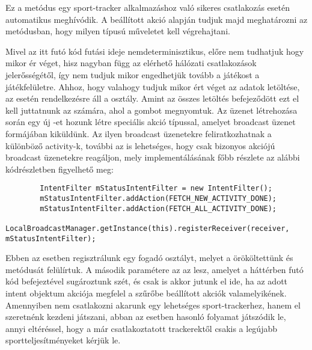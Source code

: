 Ez a metódus egy sport-tracker alkalmazáshoz való sikeres csatlakozás esetén automatikus meghívódik. 
A beállított akció alapján tudjuk majd meghatározni az  metódusban, hogy milyen típusú műveletet kell végrehajtani. 

Mivel az itt futó kód futási ideje nemdeterminisztikus, előre nem tudhatjuk hogy mikor ér véget, hisz nagyban függ az elérhető hálózati csatlakozások jelerősségétől, így nem tudjuk mikor engedhetjük tovább a játékost a játékfelületre. 
Ahhoz, hogy valahogy tudjuk mikor ért véget az adatok letöltése, az  esetén rendelkezésre áll a  osztály. 
Amint az összes letöltés befejeződött ezt el kell juttatnunk az  számára, ahol a gombot megnyomtuk. 
Az üzenet létrehozása során egy új -et hozunk létre speciális akció típussal, amelyet broadcast üzenet formájában kiküldünk. 
Az ilyen broadcast üzenetekre feliratkozhatnak a különböző activity-k, további az is lehetséges, hogy csak bizonyos akciójú broadcast üzenetekre reagáljon, mely implementálásának főbb részlete az alábbi kódrészletben figyelhető meg:

\begin{lstlisting}
        IntentFilter mStatusIntentFilter = new IntentFilter();
        mStatusIntentFilter.addAction(FETCH_NEW_ACTIVITY_DONE);
        mStatusIntentFilter.addAction(FETCH_ALL_ACTIVITY_DONE);
        LocalBroadcastManager.getInstance(this).registerReceiver(receiver, mStatusIntentFilter);
\end{lstlisting}

Ebben az esetben regisztrálunk egy fogadó osztályt, melyet a  örököltettünk és  metódusát felülírtuk. 
A második paramétere az az  lesz, amelyet a háttérben futó kód befejeztével sugároztunk szét, és csak is akkor jutunk el ide, ha az adott intent objektum akciója megfelel a szűrőbe beállított akciók valamelyikének. 
Amennyiben nem csatlakozni akarunk egy lehetséges sport-trackerhez, hanem el szeretnénk kezdeni játszani, abban az esetben hasonló folyamat játszódik le, annyi eltéréssel, hogy a már csatlakoztatott trackerektől csakis a legújabb sportteljesítményeket kérjük le. 






